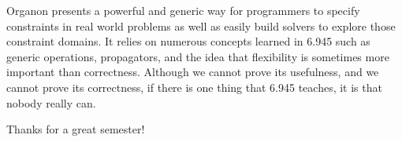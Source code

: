 \documentclass[12pt,a4paper]{article}
\begin{document}
Organon presents a powerful and generic way for programmers to specify constraints in real world problems as well as easily build solvers to explore those constraint domains.  It relies on numerous concepts learned in 6.945 such as generic operations, propagators, and the idea that flexibility is sometimes more important than correctness.  Although we cannot prove its usefulness, and we cannot prove its correctness, if there is one thing that 6.945 teaches, it is that nobody really can.

Thanks for a great semester!
\end{document}
